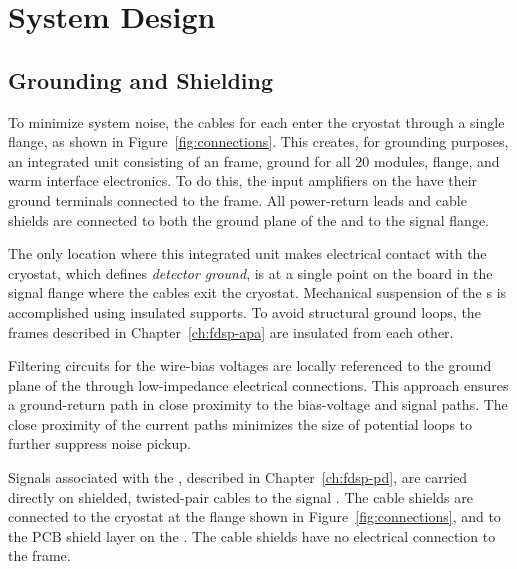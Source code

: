 \section{System Design}
\label{sec:fdsp-tpcelec-design}
\subsection{Grounding and Shielding}
\label{sec:fdsp-tpcelec-design-grounding}


To minimize system noise, the  cables for each  enter 
the cryostat through a single  flange, as shown in Figure~\ref{fig:connections}. This creates, for grounding purposes, an integrated unit consisting of an  frame,  ground for all \num{20}  modules,  flange, and warm interface
electronics. To do this,
the input amplifiers on the   have their ground terminals connected to the  frame. 
All power-return leads and cable shields are connected to both the ground plane of the  and to the  signal flange.

The only location where this integrated unit makes electrical contact with the 
cryostat, which defines \textit{detector ground}, is at a single point on the  \fdth board in the  signal flange where the 
cables exit the cryostat. Mechanical suspension of the s is accomplished using insulated supports. 
To avoid structural ground loops, the  frames described in Chapter~\ref{ch:fdsp-apa} are 
insulated from each other.

Filtering circuits for the  wire-bias voltages are locally referenced to the ground plane of the  through low-impedance electrical connections. This approach ensures a ground-return path in close proximity to the bias-voltage and signal paths. The close proximity of the current paths minimizes the size of potential loops to further suppress noise pickup.

Signals associated with the , described in Chapter~\ref{ch:fdsp-pd}, are carried directly on shielded, 
twisted-pair cables to the signal \fdth. The cable shields are connected to the cryostat 
at the  flange shown in Figure~\ref{fig:connections}, and to the PCB  shield layer on the . The cable shields have no electrical connection to the  frame.

